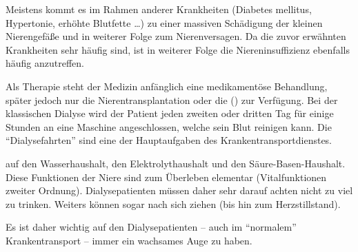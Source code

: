 
Meistens kommt es im Rahmen anderer Krankheiten (Diabetes
mellitus, Hypertonie, erhöhte Blutfette \ldots) zu einer
massiven Schädigung der kleinen Nierengefäße und in weiterer
Folge zum Nierenversagen. Da die zuvor erwähnten Krankheiten
sehr häufig sind, ist in weiterer Folge die
Niereninsuffizienz ebenfalls häufig anzutreffen.

Als Therapie steht der Medizin anfänglich eine medikamentöse
Behandlung, später jedoch nur die Nierentransplantation oder
die  () zur
Verfügung. Bei der klassischen Dialyse wird der Patient jeden
zweiten oder dritten Tag für einige Stunden an eine Maschine
angeschlossen, welche sein Blut reinigen kann. Die
\enquote{Dialysefahrten} sind eine der Hauptaufgaben des
Krankentransportdienstes.

auf den Wasserhaushalt, den Elektrolythaushalt und den
Säure-Basen-Haushalt. Diese Funktionen der Niere sind zum
Überleben elementar (Vitalfunktionen zweiter Ordnung).
Dialysepatienten müssen daher sehr darauf achten nicht zu
viel zu trinken. Weiters können  sogar
 nach sich ziehen (bis hin zum
Herzstillstand).

Es ist daher wichtig auf den Dialysepatienten -- auch im
\enquote{normalem} Krankentransport -- immer ein wachsames Auge zu
haben.







% 
% 
% 
% 
% 
% 
% 
% 




